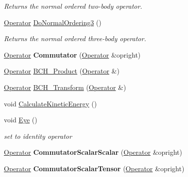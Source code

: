 \begin{DoxyCompactItemize}
\begin{DoxyCompactList}\small\item\em Returns the normal ordered two-\/body operator. \end{DoxyCompactList}\item 
\hyperlink{classOperator}{Operator} \hyperlink{classOperator_a7fd029569796107c87ff17c5a7912480}{Do\-Normal\-Ordering3} ()
\begin{DoxyCompactList}\small\item\em Returns the normal ordered three-\/body operator. \end{DoxyCompactList}\item 
\hypertarget{classOperator_a9d78ca5fd265cf4ccc6cda81d35cb086}{\hyperlink{classOperator}{Operator} {\bfseries Commutator} (\hyperlink{classOperator}{Operator} \&opright)}\label{classOperator_a9d78ca5fd265cf4ccc6cda81d35cb086}

\item 
\hyperlink{classOperator}{Operator} \hyperlink{classOperator_a6a91cd02db723ee28b7532e6af029033}{B\-C\-H\-\_\-\-Product} (\hyperlink{classOperator}{Operator} \&)
\item 
\hyperlink{classOperator}{Operator} \hyperlink{classOperator_adc5537604f6b71121163370aca79dfef}{B\-C\-H\-\_\-\-Transform} (\hyperlink{classOperator}{Operator} \&)
\item 
void \hyperlink{classOperator_a701c64f8be794e89fd28a643b56d534a}{Calculate\-Kinetic\-Energy} ()
\item 
\hypertarget{classOperator_a03a378f0da2fe71d8160bd3262891457}{void \hyperlink{classOperator_a03a378f0da2fe71d8160bd3262891457}{Eye} ()}\label{classOperator_a03a378f0da2fe71d8160bd3262891457}

\begin{DoxyCompactList}\small\item\em set to identity operator \end{DoxyCompactList}\item 
\hypertarget{classOperator_a55b95477ad8674877eb4d15491cfe9a0}{\hyperlink{classOperator}{Operator} {\bfseries Commutator\-Scalar\-Scalar} (\hyperlink{classOperator}{Operator} \&opright)}\label{classOperator_a55b95477ad8674877eb4d15491cfe9a0}

\item 
\hypertarget{classOperator_a7db0372f91cffc85b293f7750c72944a}{\hyperlink{classOperator}{Operator} {\bfseries Commutator\-Scalar\-Tensor} (\hyperlink{classOperator}{Operator} \&opright)}\label{classOperator_a7db0372f91cffc85b293f7750c72944a}


\end{DoxyCompactItemize}
